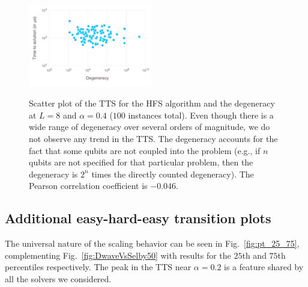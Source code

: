 %
\begin{figure}
\begin{center}
{\includegraphics[width=0.48\textwidth]{chapters/Planted/big_deg_scatter_HFS}}
\caption{Scatter plot of the TTS for the HFS algorithm and the degeneracy at $L=8$ and $\alpha = 0.4$ ($100$ instances total).
  Even though there is a wide range of degeneracy over several orders of magnitude, we do not observe any trend in the TTS.
The degeneracy accounts for the fact that some qubits are not coupled into the problem (e.g., if $n$ qubits are not specified for that particular problem, then the degeneracy is $2^n$ times the directly counted degeneracy). The Pearson correlation coefficient is $-0.046$.}
\label{fig:DegHardness}
\end{center}
\end{figure}



\subsection{Additional easy-hard-easy transition plots} \label{sec:phasetransition}
The universal nature of the scaling behavior can be seen in Fig.~\ref{fig:pt_25_75}, complementing Fig.~\ref{fig:DwaveVsSelby50} with results for the $25$th and $75$th percentiles respectively. The peak in the TTS near $\alpha=0.2$ is a feature shared by all the solvers we considered.


